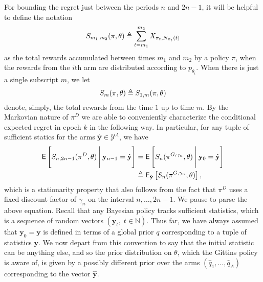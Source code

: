 \begin{myproof}[Proof.]
	For bounding the regret just between the periods $n$ and $2n-1$, it will be helpful to define the notation 
	\[
		S_{m_1,m_2}(\pi, \theta) \defeq \sum_{t=m_1}^{m_2} X_{\pi_t,N_{\pi_t}(t)}
	\]
	as the total rewards accumulated between times $m_1$ and $m_2$ by a policy $\pi$, when the rewards from the $i$th arm are distributed according to $p_{\theta_i}$. When there is just a single subscript $m$, we let 
	\[S_m(\pi, \theta) \defeq S_{1,m}(\pi, \theta)\]
	denote, simply, the total rewards from the time $1$ up to time $m$. By the Markovian nature of $\pi^D$ we are able to conveniently characterize the conditional expected regret in epoch $k$ in the following way. In particular, for any tuple of sufficient statics for the arms $\hat{\mathbf y} \in \mathcal Y^A$, we have
	\begin{align}
		\E\left[S_{n,2n-1}(\pi^D, \theta) \given[\Bigg] \mathbf y_{n-1} = \hat {\mathbf y}\right] & =  \E\left[S_{n}(\pi^{G,\gamma_n}, \theta) \given[\Bigg] \mathbf y_0 = \hat {\mathbf y}\right] \nonumber \\
		& \defeq \E_{\hat{\mathbf y}}\left[S_{n}(\pi^{G,\gamma_n}, \theta) \right], \label{eqn:prop1_stationarity}
	\end{align}
	which is a stationarity property that also follows from the fact that $\pi^D$ uses a fixed discount factor of $\gamma_n$ on the interval $n,\ldots,2n-1$. We pause to parse the above equation. Recall that any Bayesian policy tracks sufficient statistics, which is a sequence of random vectors $\left(\mathbf y_t, \; t \in \mathbb{N}\right)$. Thus far, we have always assumed that $\mathbf y_0 = \mathbf y$ is defined in terms of a global prior $q$ corresponding to a tuple of statistics ${\mathbf y}$. We now depart from this convention to say that the initial statistic can be anything else, and so the prior distribution on $\theta$, which the Gittins policy is aware of, is given by a possibly different prior over the arms $(\hat q_1,\ldots,\hat q_A)$ corresponding to the vector $\hat {\mathbf y}$.
	

\end{myproof}
